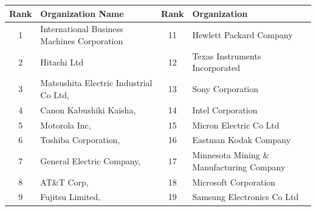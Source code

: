 \begin{table}[h]
\centering
\begin{tabular}{clcl}
\hline
\multicolumn{1}{|l|}{\textbf{Rank}} & \multicolumn{1}{l|}{\textbf{Organization Name}}                  & \multicolumn{1}{l|}{\textbf{Rank}} & \multicolumn{1}{l|}{\textbf{Organization}}                     \\ \hline
\multicolumn{1}{|c|}{1}             & \multicolumn{1}{l|}{International Business Machines Corporation} & \multicolumn{1}{c|}{11}            & \multicolumn{1}{l|}{Hewlett Packard Company}                   \\ \hline
\multicolumn{1}{|c|}{2}             & \multicolumn{1}{l|}{Hitachi Ltd}                                 & \multicolumn{1}{c|}{12}            & \multicolumn{1}{l|}{Texas Instruments Incorporated}            \\ \hline
\multicolumn{1}{|c|}{3}             & \multicolumn{1}{l|}{Matsushita Electric Industrial Co Ltd,}      & \multicolumn{1}{c|}{13}            & \multicolumn{1}{l|}{Sony Corporation}                          \\ \hline
\multicolumn{1}{|c|}{4}             & \multicolumn{1}{l|}{Canon Kabushiki Kaisha,}                     & \multicolumn{1}{c|}{14}            & \multicolumn{1}{l|}{Intel Corporation}                         \\ \hline
\multicolumn{1}{|c|}{5}             & \multicolumn{1}{l|}{Motorola Inc,}                               & \multicolumn{1}{c|}{15}            & \multicolumn{1}{l|}{Micron Electric Co Ltd}                    \\ \hline
\multicolumn{1}{|c|}{6}             & \multicolumn{1}{l|}{Toshiba Corporation,}                        & \multicolumn{1}{c|}{16}            & \multicolumn{1}{l|}{Eastman Kodak Company}                     \\ \hline
\multicolumn{1}{|c|}{7}             & \multicolumn{1}{l|}{General Electric Company,}                   & \multicolumn{1}{c|}{17}            & \multicolumn{1}{l|}{Minnesota Mining \& Manufacturing Company} \\ \hline
\multicolumn{1}{|c|}{8}             & \multicolumn{1}{l|}{AT\&T Corp,}                                 & \multicolumn{1}{c|}{18}            & \multicolumn{1}{l|}{Microsoft Corporation}                     \\ \hline
\multicolumn{1}{|c|}{9}             & \multicolumn{1}{l|}{Fujitsu Limited,}                            & \multicolumn{1}{c|}{19}            & \multicolumn{1}{l|}{Samsung Electronics Co Ltd}                \\ \hline

\end{tabular}
\end{table}
